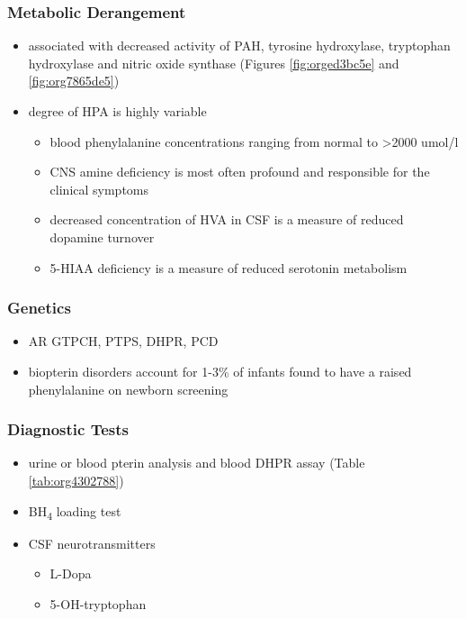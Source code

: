\documentclass[12pt]{scrartcl}
\begin{document}
\subsubsection{Metabolic Derangement}
\label{sec:org5d309ed}
\begin{itemize}
\item associated with decreased activity of PAH, tyrosine hydroxylase,
tryptophan hydroxylase and nitric oxide synthase (Figures \ref{fig:orged3bc5e}
and \ref{fig:org7865de5})
\item degree of HPA is highly variable
\begin{itemize}
\item blood phenylalanine concentrations ranging from normal to \textgreater{}2000
umol/l
\item CNS amine deficiency is most often profound and responsible for
the clinical symptoms
\item decreased concentration of HVA in CSF is a measure of reduced
dopamine turnover
\item 5-HIAA deficiency is a measure of reduced serotonin metabolism
\end{itemize}
\end{itemize}

\subsubsection{Genetics}
\label{sec:org26f0dca}
\begin{itemize}
\item AR GTPCH, PTPS, DHPR, PCD
\item biopterin disorders account for 1-3\% of infants found to have a
raised phenylalanine on newborn screening
\end{itemize}

\subsubsection{Diagnostic Tests}
\label{sec:org2299121}
\begin{itemize}
\item urine or blood pterin analysis and blood DHPR assay (Table \ref{tab:org4302788})
\item BH\textsubscript{4} loading test
\item CSF neurotransmitters
\begin{itemize}
\item L-Dopa
\item 5-OH-tryptophan
\end{itemize}
\end{itemize}
\end{document}
